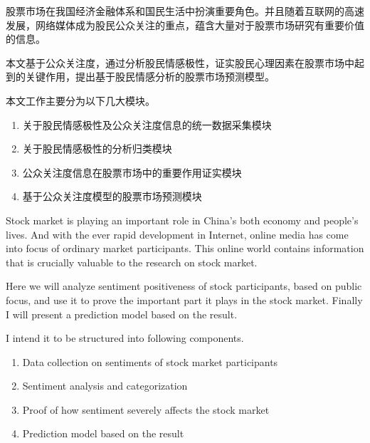 \begin{cabstract}
  股票市场在我国经济金融体系和国民生活中扮演重要角色。并且随着互联网的高速发展，网络媒体成为股民公众关注的重点，蕴含大量对于股票市场研究有重要价值的信息。

  本文基于公众关注度，通过分析股民情感极性，证实股民心理因素在股票市场中起到的关键作用，提出基于股民情感分析的股票市场预测模型。

  本文工作主要分为以下几大模块。

  \begin{enumerate}
    \item 关于股民情感极性及公众关注度信息的统一数据采集模块
    \item 关于股民情感极性的分析归类模块
    \item 公众关注度信息在股票市场中的重要作用证实模块
    \item 基于公众关注度模型的股票市场预测模块
  \end{enumerate}
\end{cabstract}


\begin{eabstract}
  Stock market is playing an important role in China's both economy and people's lives. And with the ever rapid development in Internet, online media has come into focus of ordinary market participants. This online world contains information that is crucially valuable to the research on stock market.

  Here we will analyze sentiment positiveness of stock participants, based on public focus, and use it to prove the important part it plays in the stock market. Finally I will present a prediction model based on the result.

  I intend it to be structured into following components.

  \begin{enumerate}
    \item Data collection on sentiments of stock market participants
    \item Sentiment analysis and categorization
    \item Proof of how sentiment severely affects the stock market
    \item Prediction model based on the result
  \end{enumerate}
\end{eabstract}

